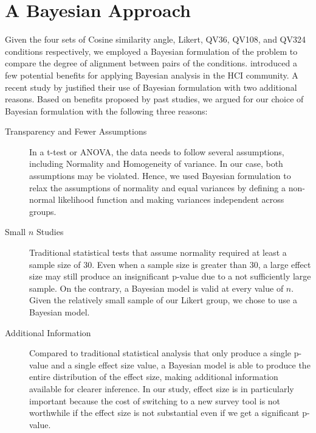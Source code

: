 \section{A Bayesian Approach}
\label{A Bayesian Approach}

Given the four sets of Cosine similarity angle,
Likert, QV36, QV108, and QV324 conditions respectively,
we employed a Bayesian formulation of the problem 
to compare the degree of alignment between pairs of the conditions. 
\textcite{kay2016researcher} introduced a few potential benefits  
for applying Bayesian analysis in the HCI community. 
A recent study by \textcite{xiao2019should}
justified their use of Bayesian formulation 
with two additional reasons.
Based on benefits proposed by past studies, 
we argued for our choice of Bayesian formulation 
with the following three reasons:

\begin{description}
    \item[Transparency and Fewer Assumptions]
    In a t-test or ANOVA, 
    the data needs to follow several assumptions, 
    including Normality and Homogeneity of variance. 
    In our case, both assumptions may be violated. 
    Hence, we used Bayesian formulation 
    to relax the assumptions of normality and 
    equal variances by defining 
    a non-normal likelihood function 
    and making variances independent across groups.
    \item[Small $n$ Studies] 
    Traditional statistical tests 
    that assume normality 
    required at least a sample size of 30. 
    Even when a sample size is greater than 30, 
    a large effect size may still produce 
    an insignificant p-value 
    due to a not sufficiently large sample. 
    On the contrary, 
    a Bayesian model is valid at every value of $n$. 
    Given the relatively small sample 
    of our Likert group, 
    we chose to use a Bayesian model.
    \item[Additional Information] 
    Compared to traditional statistical analysis 
    that only produce a single p-value 
    and a single effect size value, 
    a Bayesian model is able to produce 
    the entire distribution of the effect size, 
    making additional information available 
    for clearer inference. 
    In our study, 
    effect size is in particularly important 
    because the cost of switching to a new survey tool 
    is not worthwhile 
    if the effect size is not substantial 
    even if we get a significant p-value.
\end{description}


